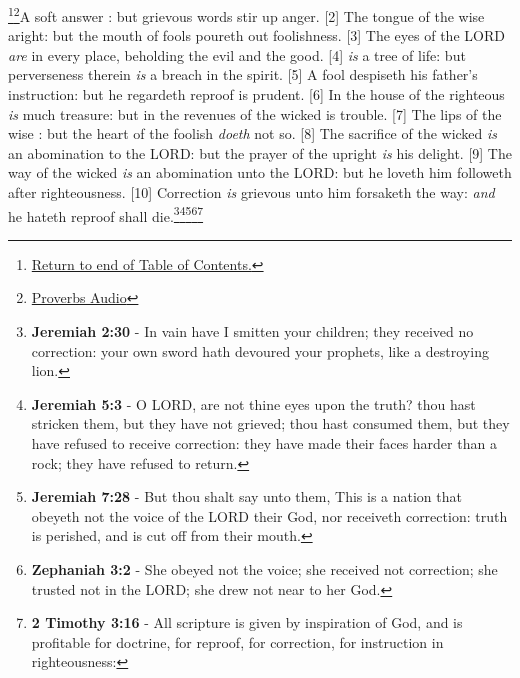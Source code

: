 \footnote{\textcolor[cmyk]{0.99998,1,0,0}{\hyperlink{TOC}{Return to end of Table of Contents.}}}\footnote{\href{https://audiobible.com/bible/proverbs_15.html}{\textcolor[cmyk]{0.99998,1,0,0}{Proverbs Audio}}}\textcolor[cmyk]{0.99998,1,0,0}{A soft answer : but grievous words stir up anger.}
[2] \textcolor[cmyk]{0.99998,1,0,0}{The tongue of the wise  aright: but the mouth of fools poureth out foolishness.}
[3] \textcolor[cmyk]{0.99998,1,0,0}{The eyes of the LORD \emph{are} in every place, beholding the evil and the good.}
[4] \textcolor[cmyk]{0.99998,1,0,0}{ \emph{is} a tree of life: but perverseness therein \emph{is} a breach in the spirit.}
[5] \textcolor[cmyk]{0.99998,1,0,0}{A fool despiseth his father's instruction: but he  regardeth reproof is prudent.}
[6] \textcolor[cmyk]{0.99998,1,0,0}{In the house of the righteous \emph{is} much treasure: but in the revenues of the wicked is trouble.}
[7] \textcolor[cmyk]{0.99998,1,0,0}{The lips of the wise : but the heart of the foolish \emph{doeth} not so.}
[8] \textcolor[cmyk]{0.99998,1,0,0}{The sacrifice of the wicked \emph{is} an abomination to the LORD: but the prayer of the upright \emph{is} his delight.}
[9] \textcolor[cmyk]{0.99998,1,0,0}{The way of the wicked \emph{is} an abomination unto the LORD: but he loveth him  followeth after righteousness.}
[10] \textcolor[cmyk]{0.99998,1,0,0}{Correction \emph{is} grievous unto him  forsaketh the way: \emph{and} he  hateth reproof shall die.}\footnote{\textbf{Jeremiah 2:30} - In vain have I smitten your children; they received no correction: your own sword hath devoured your prophets, like a destroying lion.}\footnote{\textbf{Jeremiah 5:3} - O LORD, are not thine eyes upon the truth? thou hast stricken them, but they have not grieved; thou hast consumed them, but they have refused to receive correction: they have made their faces harder than a rock; they have refused to return.}\footnote{\textbf{Jeremiah 7:28} - But thou shalt say unto them, This is a nation that obeyeth not the voice of the LORD their God, nor receiveth correction: truth is perished, and is cut off from their mouth.}\footnote{\textbf{Zephaniah 3:2} - She obeyed not the voice; she received not correction; she trusted not in the LORD; she drew not near to her God.}\footnote{\textbf{2 Timothy 3:16} - All scripture is given by inspiration of God, and is profitable for doctrine, for reproof, for correction, for instruction in righteousness:}
